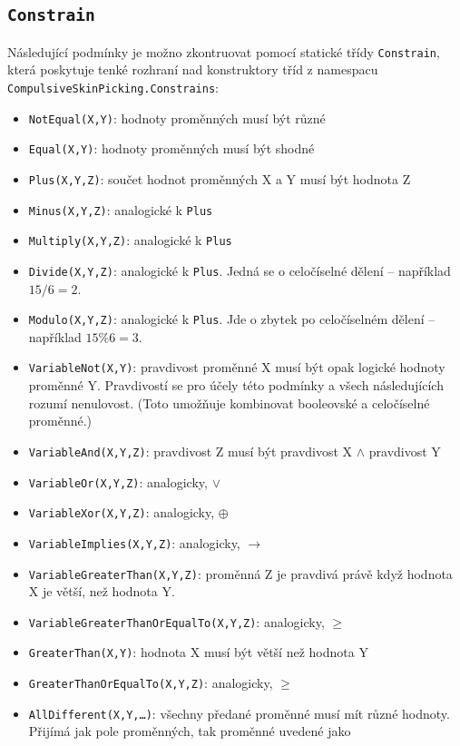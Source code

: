 \documentclass[a4paper]{article}
\begin{document}
\subsection{\texttt{Constrain}}
Následující podmínky je možno zkontruovat pomocí statické třídy \texttt{Constrain},
která poskytuje tenké rozhraní nad konstruktory tříd z namespacu
\texttt{CompulsiveSkinPicking.Constrains}:
\begin{itemize}
\item
	\texttt{NotEqual(X,Y)}: hodnoty proměnných musí být různé
\item
	\texttt{Equal(X,Y)}: hodnoty proměnných musí být shodné
\item
	\texttt{Plus(X,Y,Z)}: součet hodnot proměnných X a Y musí být hodnota Z
\item
	\texttt{Minus(X,Y,Z)}: analogické k \texttt{Plus}
\item
	\texttt{Multiply(X,Y,Z)}: analogické k \texttt{Plus}
\item
	\texttt{Divide(X,Y,Z)}: analogické k \texttt{Plus}. Jedná se o
	celočíselné dělení -- například $15 / 6 = 2$.
\item
	\texttt{Modulo(X,Y,Z)}: analogické k \texttt{Plus}. Jde o zbytek po
	celočíselném dělení -- například $15 \% 6 = 3$.
\item
	\texttt{VariableNot(X,Y)}: pravdivost proměnné X musí být opak
	logické hodnoty proměnné Y. Pravdivostí se pro účely této podmínky
	a všech následujících rozumí nenulovost. (Toto umožňuje kombinovat
	booleovské a celočíselné proměnné.)
\item
	\texttt{VariableAnd(X,Y,Z)}: pravdivost Z musí být pravdivost X $\wedge$
	pravdivost Y
\item
	\texttt{VariableOr(X,Y,Z)}: analogicky, $\vee$
\item
	\texttt{VariableXor(X,Y,Z)}: analogicky, $\oplus$
\item
	\texttt{VariableImplies(X,Y,Z)}: analogicky, $\rightarrow$
\item
	\texttt{VariableGreaterThan(X,Y,Z)}: proměnná Z je pravdivá právě když
	hodnota X je větší, než hodnota Y.
\item
	\texttt{VariableGreaterThanOrEqualTo(X,Y,Z)}: analogicky, $\geq$
\item
	\texttt{GreaterThan(X,Y)}: hodnota X musí být větší než hodnota Y
\item
	\texttt{GreaterThanOrEqualTo(X,Y,Z)}: analogicky, $\geq$
\item
	\texttt{AllDifferent(X,Y,\ldots)}: všechny předané proměnné musí mít
	různé hodnoty. Přijímá jak pole proměnných, tak proměnné uvedené jako

\end{itemize}
\end{document}
